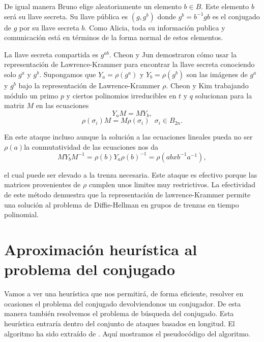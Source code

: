 \documentclass[12pt]{book}
\theoremstyle{definition}
\begin{document}
De igual manera Bruno elige aleatoriamente un elemento $b\in B$. Este elemento $b$ será su llave secreta. Su llave pública es $(g,g^b)$ donde $g^b = b^{-1}gb$ es el conjugado de $g$ por su llave secreta $b$. Como Alicia, toda su información publica y comunicación está en términos de la forma normal de estos elementos.

La llave secreta compartida es $g^{ab}$. Cheon y Jun demostraron cómo usar la representación de Lawrence-Krammer para encontrar la llave secreta conociendo solo $g^a$ y $g^b$. Supongamos que $Y_a=\rho(g^a)$ y  $Y_b=\rho(g^b)$ son las imágenes de $g^a$ y $g^b$ bajo la representación de Lawrence-Krammer $\rho$. Cheon y Kim trabajando módulo un primo $p$ y ciertos polinomios irreducibles en $t$ y $q$ solucionan para la matriz $M$ en las ecuaciones
$$Y_aM=MY_b,$$
$$\rho(\sigma_i)M=M\rho(\sigma_i)\ \ \ \sigma_i\in B_{2n}.$$

En este ataque incluso aunque la solución a las ecuaciones lineales pueda no ser $\rho(a)$la conmutatividad de las ecuaciones nos da
$$MY_bM^{-1}=\rho(b)Y_a\rho(b)^{-1}=\rho(abxb^{-1}a^{-1}),$$

el cual puede ser elevado a la trenza necesaria. Este ataque es efectivo porque las matrices provenientes de $\rho$ cumplen unos limites muy restrictivos. La efectividad de este método demuestra que la representación de lawrence-Krammer permite una solución al problema de Diffie-Hellman en grupos de trenzas en tiempo polinomial.

\section{Aproximación heurística al problema del conjugado}
Vamos a ver una heurística que nos permitirá, de forma eficiente, resolver en ocasiones el problema del conjugado devolviendonos un conjugador. De esta manera también resolvemos el problema de búsqueda del conjugado. Esta heurística entraría dentro del conjunto de ataques basados en longitud. El algoritmo ha sido extraído de \cite{Att}. Aquí mostramos el pseudocódigo del algoritmo.
\newline

\end{document}
